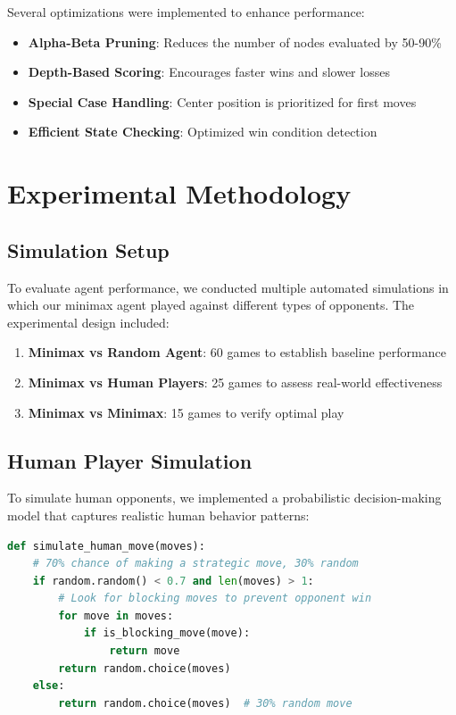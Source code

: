 \documentclass[12pt]{article}
\begin{document}
Several optimizations were implemented to enhance performance:

\begin{itemize}
    \item \textbf{Alpha-Beta Pruning}: Reduces the number of nodes evaluated by 50-90\%
    \item \textbf{Depth-Based Scoring}: Encourages faster wins and slower losses
    \item \textbf{Special Case Handling}: Center position is prioritized for first moves
    \item \textbf{Efficient State Checking}: Optimized win condition detection
\end{itemize}

\section{Experimental Methodology}

\subsection{Simulation Setup}

To evaluate agent performance, we conducted multiple automated simulations in which our minimax agent played against different types of opponents. The experimental design included:

\begin{enumerate}
    \item \textbf{Minimax vs Random Agent}: 60 games to establish baseline performance
    \item \textbf{Minimax vs Human Players}: 25 games to assess real-world effectiveness
    \item \textbf{Minimax vs Minimax}: 15 games to verify optimal play
\end{enumerate}

\subsection{Human Player Simulation}

To simulate human opponents, we implemented a probabilistic decision-making model that captures realistic human behavior patterns:

\begin{lstlisting}[language=Python, basicstyle=\small]
def simulate_human_move(moves):
    # 70% chance of making a strategic move, 30% random
    if random.random() < 0.7 and len(moves) > 1:
        # Look for blocking moves to prevent opponent win
        for move in moves:
            if is_blocking_move(move):
                return move
        return random.choice(moves)
    else:
        return random.choice(moves)  # 30% random move
\end{lstlisting}
\end{document}
